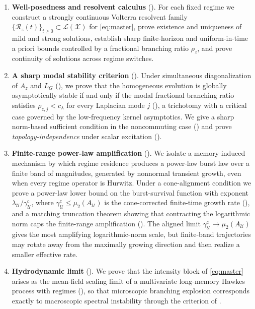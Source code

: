 \documentclass[11pt]{article}
\theoremstyle{plain}
\theoremstyle{definition}
\theoremstyle{remark}
\newcommand{\X}{\mathcal{X}}
\newcommand{\Lop}{\mathcal{L}}
\newcommand{\Res}{\mathcal{R}}
\newcommand{\lognorm}{\mu_2}
\newcommand{\branch}{\rho}
\newcommand{\HR}{\mathcal{U}}
\begin{document}
\begin{enumerate}[leftmargin=1.4em,itemsep=4pt]
\item \textbf{Well-posedness and resolvent calculus} (). For each fixed
regime we construct a strongly continuous Volterra resolvent family
$\{\Res_z(t)\}_{t\ge0}\subset\Lop(\X)$ for \eqref{eq:master}, prove existence and uniqueness of
mild and strong solutions, establish sharp finite-horizon and uniform-in-time a priori bounds
controlled by a fractional branching ratio $\branch_z$, and prove continuity of solutions across
regime switches.

\item \textbf{A sharp modal stability criterion} (). Under simultaneous
diagonalization of $A_z$ and $L_G$ (), we prove that the homogeneous evolution
is globally asymptotically stable if and only if the modal fractional branching ratio satisfies
$\branch_{z,j}<c_\lambda$ for every Laplacian mode $j$ (), a trichotomy with a
critical case governed by the low-frequency kernel asymptotics. We give a sharp norm-based
sufficient condition in the noncommuting case () and prove
\emph{topology-independence} under scalar excitation ().

\item \textbf{Finite-range power-law amplification} (). We isolate a
memory-induced mechanism by which regime residence produces a power-law burst law over a finite
band of magnitudes, generated by nonnormal transient growth, even when every regime operator
is Hurwitz. Under a cone-alignment condition we prove a power-law lower bound on the
burst-survival function with exponent $\lambda_\HR/\gamma_\HR^{\mathrm c}$, where
$\gamma_\HR^{\mathrm c}\le\lognorm(A_\HR)$ is the cone-corrected finite-time growth rate
(), and a matching truncation theorem showing that contracting the
logarithmic norm caps the finite-range amplification (). The aligned
limit $\gamma_\HR^{\mathrm c}\to\lognorm(A_\HR)$ gives the most amplifying logarithmic-norm scale,
but finite-band trajectories may rotate away from the maximally growing direction and then realize
a smaller effective rate.


\item \textbf{Hydrodynamic limit} (). We prove that the intensity block of
\eqref{eq:master} arises as the mean-field scaling limit of a multivariate long-memory Hawkes
process with regimes (), so that microscopic branching explosion corresponds
exactly to macroscopic spectral instability through the criterion of .


\end{enumerate}
\end{document}
